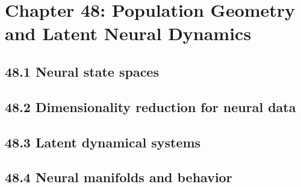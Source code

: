\section{Chapter 48: Population Geometry and Latent Neural Dynamics}

\subsection{48.1 Neural state spaces}

\subsection{48.2 Dimensionality reduction for neural data}

\subsection{48.3 Latent dynamical systems}

\subsection{48.4 Neural manifolds and behavior}

\clearpage
